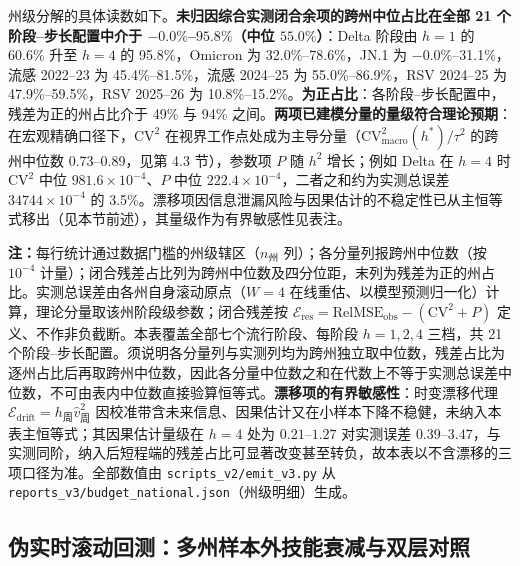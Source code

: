 \documentclass[10pt,a4paper]{article}
\theoremstyle{plain}
\theoremstyle{definition}
\begin{document}
州级分解的具体读数如下。\textbf{未归因综合实测闭合余项的跨州中位占比在全部 21 个阶段--步长配置中介于 $-0.0\%$--$95.8\%$（中位 $55.0\%$）}：Delta 阶段由 $h=1$ 的 60.6\% 升至 $h=4$ 的 95.8\%，Omicron 为 32.0\%--78.6\%，JN.1 为 $-0.0\%$--31.1\%，流感 2022--23 为 45.4\%--81.5\%，流感 2024--25 为 55.0\%--86.9\%，RSV 2024--25 为 47.9\%--59.5\%，RSV 2025--26 为 10.8\%--15.2\%。\textbf{为正占比}：各阶段--步长配置中，残差为正的州占比介于 49\% 与 94\% 之间。\textbf{两项已建模分量的量级符合理论预期}：在宏观精确口径下，$\text{CV}^2$ 在视界工作点处成为主导分量（$\text{CV}^2_{\text{macro}}(h^*)/\tau^2$ 的跨州中位数 0.73--0.89，见第 4.3 节），参数项 $P$ 随 $h^2$ 增长；例如 Delta 在 $h=4$ 时 $\text{CV}^2$ 中位 $981.6\times10^{-4}$、$P$ 中位 $222.4\times10^{-4}$，二者之和约为实测总误差 $34744\times10^{-4}$ 的 3.5\%。漂移项因信息泄漏风险与因果估计的不稳定性已从主恒等式移出（见本节前述），其量级作为有界敏感性见表注。

\begin{table}[htbp]
\centering
\footnotesize
\caption{三项描述性误差记账的州级分解（各分量绝对值 $\times 10^{-4}$ 的中位数与闭合残差占比分布）}
\label{tab:budget_four}
\resizebox{\textwidth}{!}{%
%
}
\vspace{2pt}
\begin{flushleft}
\scriptsize \textbf{注：}每行统计通过数据门槛的州级辖区（$n_{\text{州}}$ 列）；各分量列报跨州中位数（按 $10^{-4}$ 计量）；闭合残差占比列为跨州中位数及四分位距，末列为残差为正的州占比。实测总误差由各州自身滚动原点（$W=4$ 在线重估、以模型预测归一化）计算，理论分量取该州阶段级参数；闭合残差按 $\mathcal{E}_{\text{res}} = \text{RelMSE}_{\text{obs}} - (\text{CV}^2 + P)$ 定义、不作非负截断。本表覆盖全部七个流行阶段、每阶段 $h=1,2,4$ 三档，共 21 个阶段--步长配置。须说明各分量列与实测列均为跨州独立取中位数，残差占比为逐州占比后再取跨州中位数，因此各分量中位数之和在代数上不等于实测总误差中位数，不可由表内中位数直接验算恒等式。\textbf{漂移项的有界敏感性}：时变漂移代理 $\mathcal{E}_{\text{drift}} = h_{\text{周}}\widehat{v}^2_{\text{周}}$ 因校准带含未来信息、因果估计又在小样本下降不稳健，未纳入本表主恒等式；其因果估计量级在 $h=4$ 处为 $0.21$--$1.27$ 对实测误差 $0.39$--$3.47$，与实测同阶，纳入后短程端的残差占比可显著改变甚至转负，故本表以不含漂移的三项口径为准。全部数值由 \texttt{scripts\_v2/emit\_v3.py} 从 \texttt{reports\_v3/budget\_national.json}（州级明细）生成。\end{flushleft}
\end{table}

\subsection{伪实时滚动回测：多州样本外技能衰减与双层对照}\label{sec:rolling_eval}
\end{document}
